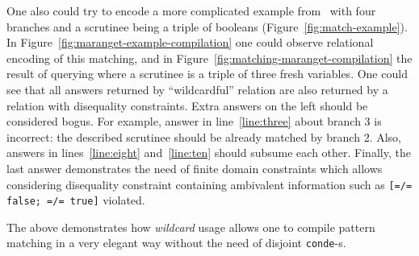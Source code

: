 One also could try to encode a more complicated example from~\cite{maranget2001} with four branches and a scrutinee being a triple of booleans (Figure~\ref{fig:match-example}).
In Figure~\ref{fig:maranget-example-compilation} one could observe relational encoding of this matching, 
and in Figure~\ref{fig:matching-maranget-compilation} the result of querying where a scrutinee is a triple of three fresh variables.
One could see that all answers returned by ``wildcardful'' relation are also returned by a relation with disequality constraints.
Extra answers on the left should be considered bogus.
For example, answer in line~\ref{line:three} about branch 3 is incorrect: the described scrutinee should be already matched by branch 2.
Also, answers in lines~\ref{line:eight} and~\ref{line:ten} should subsume each other.
Finally, the last answer demonstrates the need of finite domain constraints which allows considering disequality constraint containing ambivalent information such as \lstinline{[=/= false; =/= true]} violated.

The above demonstrates how \emph{wildcard} usage allows one to compile pattern matching in a very elegant way without the need of disjoint \lstinline{conde}-s.
